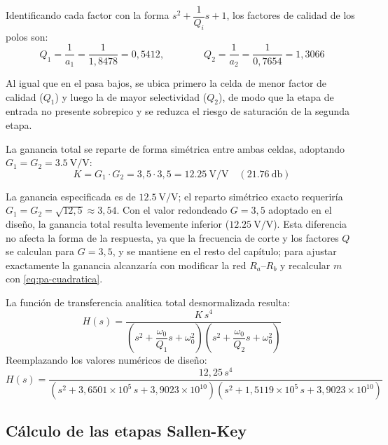 Identificando cada factor con la forma $s^2 + \dfrac{1}{Q_i} s + 1$, los factores de calidad de los polos son:
\begin{equation}
  Q_1 = \frac{1}{a_1} = \frac{1}{1{,}8478} = 0{,}5412, \qquad\qquad Q_2 = \frac{1}{a_2} = \frac{1}{0{,}7654} = 1{,}3066
  \label{eq:pa-factores-q}
\end{equation}

Al igual que en el pasa bajos, se ubica primero la celda de menor factor de calidad ($Q_1$) y luego la de mayor
selectividad ($Q_2$), de modo que la etapa de entrada no presente sobrepico y se reduzca el riesgo de saturación de la
segunda etapa.

La ganancia total se reparte de forma simétrica entre ambas celdas, adoptando $G_1 = G_2 = \SI{3.5}{\volt/\volt}$:
\begin{equation}
  K = G_1 \cdot G_2 = 3{,}5 \cdot 3{,}5 = \SI{12.25}{\volt/\volt} \quad (\SI{21.76}{\decibel})
  \label{eq:pa-ganancia}
\end{equation}

La ganancia especificada es de $\SI{12.5}{\volt/\volt}$; el reparto simétrico exacto requeriría
$G_1 = G_2 = \sqrt{12{,}5} \approx 3{,}54$. Con el valor redondeado $G = 3{,}5$ adoptado en el diseño, la ganancia
total resulta levemente inferior ($\SI{12.25}{\volt/\volt}$). Esta diferencia no afecta la forma de la respuesta, ya
que la frecuencia de corte y los factores $Q$ se calculan para $G = 3{,}5$, y se mantiene en el resto del capítulo;
para ajustar exactamente la ganancia alcanzaría con modificar la red $R_a$--$R_b$ y recalcular $m$ con
\eqref{eq:pa-cuadratica}.

La función de transferencia analítica total desnormalizada resulta:
\begin{equation}
  H(s) = \frac{K\,s^4}{\left( s^2 + \dfrac{\omega_0}{Q_1} s + \omega_0^2 \right)
    \left( s^2 + \dfrac{\omega_0}{Q_2} s + \omega_0^2 \right)}
  \label{eq:pa-transferencia-gral}
\end{equation}
Reemplazando los valores numéricos de diseño:
\begin{equation}
  H(s) = \frac{12{,}25\,s^4}{\left( s^2 + 3{,}6501 \times 10^5\,s + 3{,}9023 \times 10^{10} \right)
    \left( s^2 + 1{,}5119 \times 10^5\,s + 3{,}9023 \times 10^{10} \right)}
  \label{eq:pa-transferencia-num}
\end{equation}

\subsection{Cálculo de las etapas Sallen-Key}
\label{subsec:pa-etapas}


